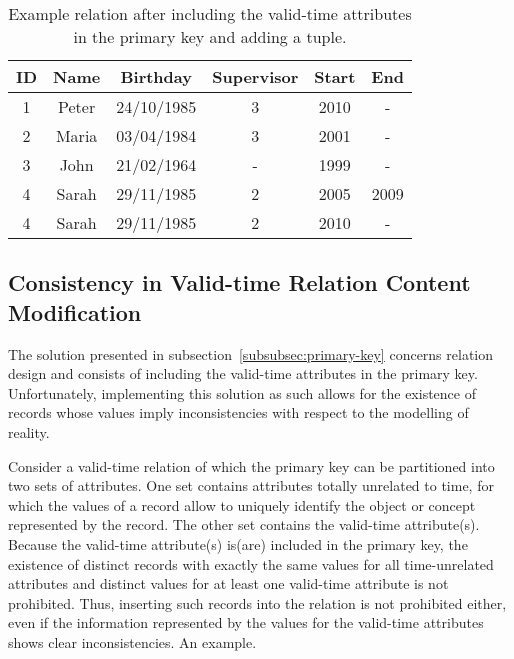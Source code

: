 


\begin{table}
\centering
\caption{Example relation after including the valid-time attributes in the primary key and adding a tuple.}
\begin{tabular}{c c c c c c }
\hline
\textbf{ID} & \textbf{Name} & \textbf{Birthday} & \textbf{Supervisor} & \textbf{Start} & \textbf{End} \\ \hline
1 & Peter & 24/10/1985 & 3 &  2010 & - \\
2 & Maria & 03/04/1984 & 3 & 2001 & - \\
3 & John & 21/02/1964 & - &  1999 & - \\
4 & Sarah & 29/11/1985 & 2 &  2005 & 2009 \\
4 & Sarah & 29/11/1985 & 2 &  2010 & - \\
\hline 
\end{tabular}
\label{table:example-database-with-new-pk}
\end{table}


\subsection{\label{subsubsec:consistency}Consistency in Valid-time Relation Content Modification}
The solution presented in subsection~\ref{subsubsec:primary-key} concerns relation design and consists of including the valid-time attributes in the primary key. Unfortunately, implementing this solution as such allows for the existence of records whose values imply inconsistencies with respect to the modelling of reality.

Consider a valid-time relation of which the primary key can be partitioned into two sets of attributes. One set contains attributes totally unrelated to time, for which the values of a record allow to uniquely identify the object or concept represented by the record. The other set contains the valid-time attribute(s). Because the valid-time attribute(s) is(are) included in the primary key, the existence of distinct records with exactly the same values for all time-unrelated attributes and distinct values for at least one valid-time attribute is not prohibited. Thus, inserting such records into the relation is not prohibited either, even if the information represented by the values for the valid-time attributes shows clear inconsistencies. An example.

